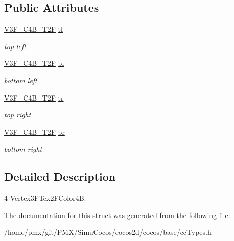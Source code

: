 \subsection*{Public Attributes}
\begin{DoxyCompactItemize}
\item 
\mbox{\label{structV3F__C4B__T2F__Quad_a55e3effa19ee04e45780b406ec03827e}} 
\hyperlink{structV3F__C4B__T2F}{V3\+F\+\_\+\+C4\+B\+\_\+\+T2F} \hyperlink{structV3F__C4B__T2F__Quad_a55e3effa19ee04e45780b406ec03827e}{tl}
\begin{DoxyCompactList}\small\item\em top left \end{DoxyCompactList}\item 
\mbox{\label{structV3F__C4B__T2F__Quad_a6a4d66baf9845358a20bfbe6d0909407}} 
\hyperlink{structV3F__C4B__T2F}{V3\+F\+\_\+\+C4\+B\+\_\+\+T2F} \hyperlink{structV3F__C4B__T2F__Quad_a6a4d66baf9845358a20bfbe6d0909407}{bl}
\begin{DoxyCompactList}\small\item\em bottom left \end{DoxyCompactList}\item 
\mbox{\label{structV3F__C4B__T2F__Quad_af2dd5294e392bf8f430d38ab5fc404d5}} 
\hyperlink{structV3F__C4B__T2F}{V3\+F\+\_\+\+C4\+B\+\_\+\+T2F} \hyperlink{structV3F__C4B__T2F__Quad_af2dd5294e392bf8f430d38ab5fc404d5}{tr}
\begin{DoxyCompactList}\small\item\em top right \end{DoxyCompactList}\item 
\mbox{\label{structV3F__C4B__T2F__Quad_a2dc23c41b586151fc704a5ee2eec1358}} 
\hyperlink{structV3F__C4B__T2F}{V3\+F\+\_\+\+C4\+B\+\_\+\+T2F} \hyperlink{structV3F__C4B__T2F__Quad_a2dc23c41b586151fc704a5ee2eec1358}{br}
\begin{DoxyCompactList}\small\item\em bottom right \end{DoxyCompactList}\end{DoxyCompactItemize}


\subsection{Detailed Description}
4 Vertex3\+F\+Tex2\+F\+Color4B. 

The documentation for this struct was generated from the following file\+:\begin{DoxyCompactItemize}
\item 
/home/pmx/git/\+P\+M\+X/\+Simu\+Cocos/cocos2d/cocos/base/cc\+Types.\+h\end{DoxyCompactItemize}

